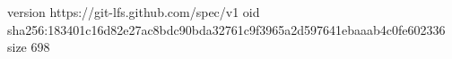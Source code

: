 version https://git-lfs.github.com/spec/v1
oid sha256:183401c16d82e27ac8bdc90bda32761c9f3965a2d597641ebaaab4c0fe602336
size 698
